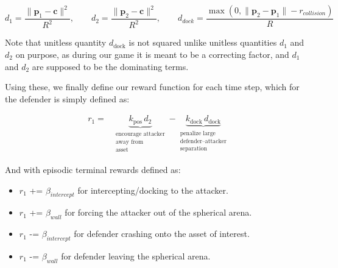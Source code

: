\[
d_1 = \frac{\|\mathbf{p}_1-\mathbf{c}\|^2}{R^2},\qquad
d_2 = \frac{\|\mathbf{p}_2-\mathbf{c}\|^2}{R^2},\qquad
d_{dock} = \frac{\max(0, \|\mathbf{p}_2-\mathbf{p}_1\| - r_{collision})}{R}
\]



Note that unitless quantity $d_{\text{dock}}$ is not squared unlike unitless quantities $d_1$ and $d_2$ on purpose, as during our game it is meant to be a correcting factor, and $d_1$ and $d_2$ are supposed to be the dominating terms. 

Using these, we finally define our reward function for each time step, which for the defender is simply defined as:


\begin{equation}
\label{eq:attacker_step_reward}
\boxed{
\begin{aligned}
r_1
= {}&
\underbrace{k_{\text{pos}}\, d_2}_{\substack{\text{encourage attacker}\\\text{away from}\\\text{asset}}}
-
\underbrace{k_{\text{dock}}\, d_{\text{dock}}}_{\substack{\text{penalize large}\\\text{defender--attacker}\\\text{separation}}}
\end{aligned}
}
\end{equation}



And with episodic terminal rewards defined as:

\begin{itemize}
    \item $r_1$ += $\beta_{intercept}$ for intercepting/docking to the attacker.
    \item $r_1$ += $\beta_{wall}$ for forcing the attacker out of the spherical arena.
    \item $r_1$ -= $\beta_{intercept}$ for defender crashing onto the asset of interest.
    \item $r_1$ -= $\beta_{wall}$ for defender leaving the spherical arena.
    
\end{itemize}

